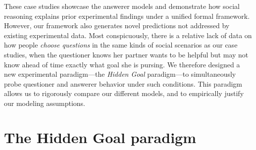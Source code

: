 \documentclass[11pt, floatsintext]{apa6}
\begin{document}



These case studies showcase the answerer models and demonstrate how social reasoning explains prior experimental findings under a unified formal framework. 
However, our framework also generates novel predictions not addressed by existing experimental data.
Most conspicuously, there is a relative lack of data on how people \emph{choose questions} in the same kinds of social scenarios as our case studies, when the questioner knows her partner wants to be helpful but may not know ahead of time exactly what goal she is pursing.
We therefore designed a new experimental paradigm---the \emph{Hidden Goal} paradigm---to simultaneously probe questioner and answerer behavior under such conditions.
This paradigm allows us to rigorously compare our different models, and to empirically justify our modeling assumptions.

\section{The Hidden Goal paradigm}
\end{document}

